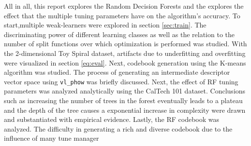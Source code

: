 \documentclass[a4paper,pra,twocolumn,10pt,aps,longbibliography,nobalancelastpage]{revtex4-1}
\begin{document}
All in all, this report explores the Random Decision Forests and the explores the effect that the multiple tuning parameters have on the algorithm's accuracy. To start,multiple weak-learners were explored in section \ref{sec:train}. The discriminating power of different learning classes as well as the relation to the number of split functions over which optimization is performed was studied. With the 2-dimensional Toy Spiral dataset, artifacts due to underfitting and overfitting were visualized in section \ref{eq:eval}. Next, codebook generation using the K-means algorithm was studied. The process of generating an intermediate descriptor vector space using \texttt{vl\_phow} was briefly discussed. Next, the effect of RF tuning parameters was analyzed analytically using the CalTech 101 dataset. Conclusions such as increasing the number of trees in the forest eventually leads to a plateau and the depth of the tree causes a exponential increase in complexity were drawn and substantiated with empirical evidence. Lastly, the RF codebook was analyzed. The difficulty in generating a rich and diverse codebook due to the influence of many tune manager
\end{document}
